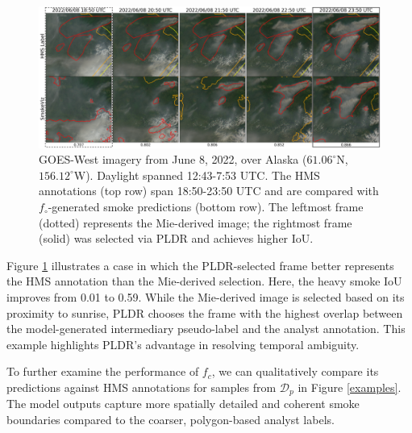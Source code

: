 \documentclass{article}
\begin{document}
\begin{figure}[!htb] 
    \centering
    \includegraphics[width=\linewidth]{figures/final_results_small.png}
        \caption{GOES-West imagery from June 8, 2022, over Alaska (\(61.06^{\circ}\)N, \(156.12^{\circ}\)W). Daylight spanned 12:43-7:53 UTC. The HMS annotations (top row) span 18:50-23:50 UTC and are compared with \(f_{\circ}\)-generated smoke predictions (bottom row). The leftmost frame (dotted) represents the Mie-derived image; the rightmost frame (solid) was selected via PLDR and achieves higher IoU.}

    \label{ml_vs_mei}
\end{figure}

Figure \ref{ml_vs_mei} illustrates a case in which the PLDR-selected frame better represents the HMS annotation than the Mie-derived selection. Here, the heavy smoke IoU improves from 0.01 to 0.59. While the Mie-derived image is selected based on its proximity to sunrise, PLDR chooses the frame with the highest overlap between the model-generated intermediary pseudo-label and the analyst annotation. This example highlights PLDR’s advantage in resolving temporal ambiguity.

To further examine the performance of \(f_c\), we can qualitatively compare its predictions against HMS annotations for samples from \(\mathcal{D}_p\) in Figure \ref{examples}. The model outputs capture more spatially detailed and coherent smoke boundaries compared to the coarser, polygon-based analyst labels.
\end{document}
